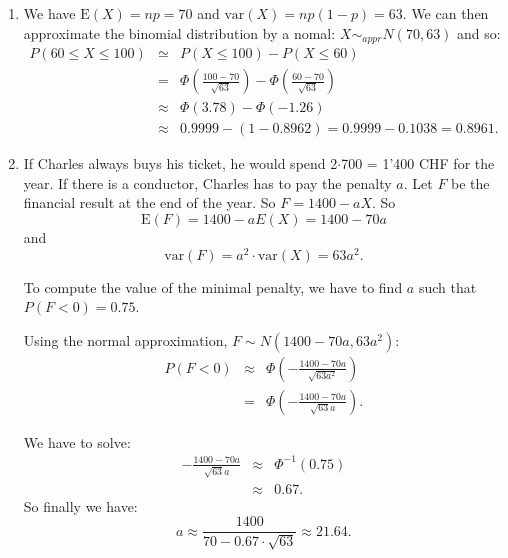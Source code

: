 \documentclass[12pt,thmsa]{article}
\begin{document}
\begin{enumerate}%
\item
We have $\text{E}(X)=np=70$ and $\text{var}(X)=np(1-p)=63$. We can then approximate the binomial distribution by a nomal:
 $X \sim_{appr} N(70,63)$ and so:
\begin{eqnarray*}
 P(60\le X \le 100)&\simeq& \left. P(X\le100)-P(X\le60) \right. \nonumber  \\
&=& \left. \Phi\left(\frac{100-70}{\sqrt{63}}\right)-\Phi\left(\frac{60-70}{\sqrt{63}}\right) \right. \nonumber  \\
& \approx & \left. \Phi(3.78) - \Phi(-1.26)  \right. \nonumber  \\
&\approx & \left.  0.9999 - (1-0.8962) = 0.9999-0.1038=0.8961. \right. \nonumber
 \end{eqnarray*}

\medskip

\item
If Charles always buys his ticket, he would spend 2$\cdot$700 = 1'400 CHF for the year.
If there is a conductor, Charles has to pay the penalty $a$.
Let $F$ be the financial result at the end of the year. So $F=1400 - a X$. So
$$\text{E}(F)=1400-a E(X) = 1400 - 70 a$$
and
$$\text{var}(F)= a^2\cdot \text{var}(X)=63a^2.$$

To compute the value of the minimal penalty, we have to find $a$ such that $P(F < 0) = 0.75$.

Using the normal approximation, $F \sim N(1400-70a,63 a^2)$:
\begin{eqnarray*}
 P(F<0)& \approx & \left.  \Phi\left(-\frac{1400-70a}{\sqrt{63 a^2}}\right) \right. \nonumber  \\
&=& \left. \Phi\left(-\frac{1400-70a}{\sqrt{63}a}\right). \right. \nonumber
 \end{eqnarray*}

We have to solve:
 \begin{eqnarray*}
-\frac{1400-70a}{\sqrt{63}a}& \approx & \left.  \Phi^{-1}(0.75) \right. \nonumber  \\
& \approx & \left.  0.67. \right. \nonumber
 \end{eqnarray*}
So finally we have:
$$
a \approx \frac{1400}{70-0.67\cdot\sqrt{63}} \approx 21.64.
$$
\end{enumerate}
\end{document}
